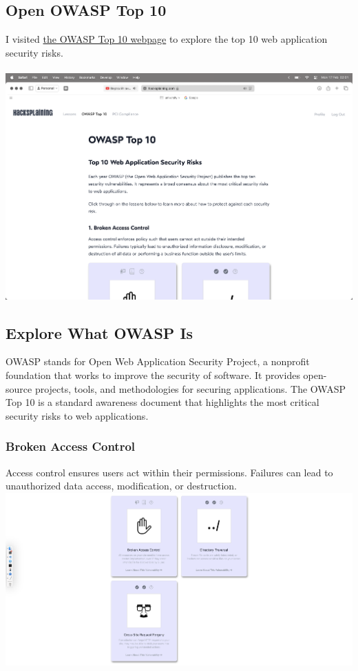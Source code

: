 \documentclass[12pt]{article}
\begin{document}
\subsection{Open OWASP Top 10}

I visited \href{https://hacksplaining.com/owasp}{the OWASP Top 10 webpage} to explore the top 10 web application security risks. \\ \\
\includegraphics[width=1\textwidth]{Image5.png}

\subsection{Explore What OWASP Is}

OWASP stands for Open Web Application Security Project, a nonprofit foundation that works to improve the security of software. It provides open-source projects, tools, and methodologies for securing applications. The OWASP Top 10 is a standard awareness document that highlights the most critical security risks to web applications. 

\newpage

\subsubsection{Broken Access Control}
Access control ensures users act within their permissions. Failures can lead to unauthorized data access, modification, or destruction. \\
\includegraphics[width=1\textwidth]{Image6.png}
\end{document}
